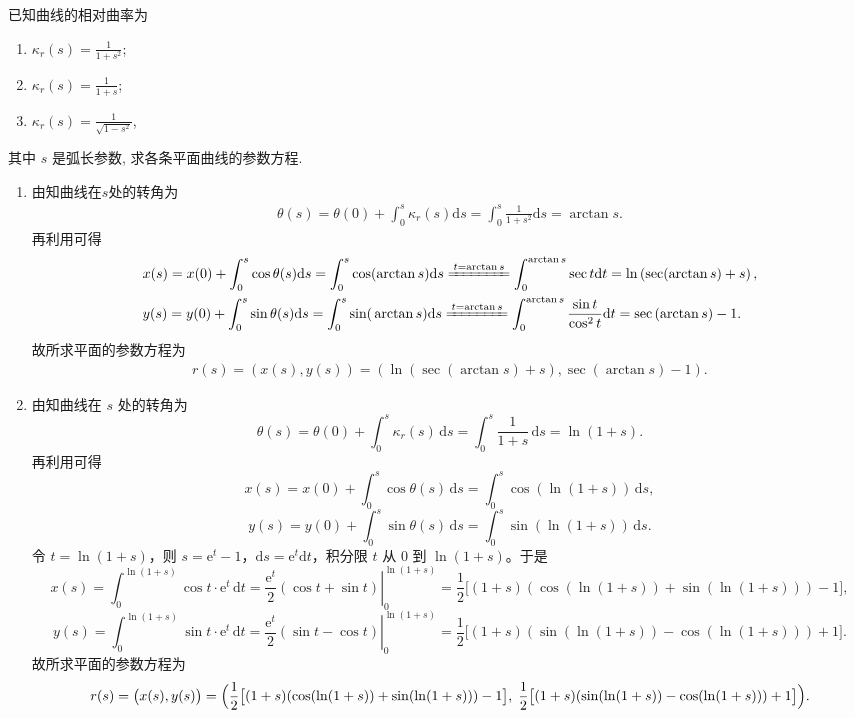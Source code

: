 \documentclass[../../main.tex]{subfiles}%
\begin{document}
\begin{example}
已知曲线的相对曲率为
\begin{enumerate}[(1)]
\item $\kappa_r(s)=\frac{1}{1+s^2}$;
\item $\kappa_r(s)=\frac{1}{1+s}$;
\item $\kappa_r(s)=\frac{1}{\sqrt{1-s^2}}$,
\end{enumerate}
其中 $s$ 是弧长参数, 求各条平面曲线的参数方程.
\end{example}
\begin{solution}
\begin{enumerate}[(1)]
\item 由知曲线在$s$处的转角为
\begin{align*}
\theta(s)=\theta(0)+\int_0^s\kappa_r(s)\mathrm{d}s=\int_0^s\frac{1}{1+s^2}\mathrm{d}s=\arctan s.
\end{align*}
再利用可得
\begin{align*}
&x(s)=x(0)+\int_0^s\cos\theta(s)\mathrm{d}s=\int_0^s\cos(\arctan s)\mathrm{d}s\xlongequal{t=\arctan s}\int_0^{\arctan s}\sec t\mathrm{d}t=\ln\left(\sec(\arctan s)+s\right),\\
&y(s)=y(0)+\int_0^s{\sin \theta (s)\mathrm{d}s}=\int_0^s{\mathrm{sin(}\arctan s)\mathrm{d}s}\xlongequal{t=\arctan s}\int_0^{\arctan s}{\frac{\sin t}{\cos ^2t}\mathrm{d}t}=\sec \left( \arctan s \right) -1.
\end{align*}
故所求平面的参数方程为
\begin{align*}
r(s)=\left(x(s),y(s)\right)=\left(\ln\left(\sec(\arctan s)+s\right),\sec \left( \arctan s \right) -1\right).
\end{align*}

\item 由知曲线在 \(s\) 处的转角为
\[
\theta(s)=\theta(0)+\int_0^s\kappa_r(s)\,\mathrm{d}s=\int_0^s\frac{1}{1+s}\,\mathrm{d}s=\ln(1+s).
\]
再利用可得
\[
x(s)=x(0)+\int_0^s\cos\theta(s)\,\mathrm{d}s=\int_0^s\cos(\ln(1+s))\,\mathrm{d}s,
\]
\[
y(s)=y(0)+\int_0^s\sin\theta(s)\,\mathrm{d}s=\int_0^s\sin(\ln(1+s))\,\mathrm{d}s.
\]
令 \(t=\ln(1+s)\)，则 \(s=\mathrm{e}^t-1\)，\(\mathrm{d}s=\mathrm{e}^t\mathrm{d}t\)，积分限 \(t\) 从 \(0\) 到 \(\ln(1+s)\)。于是
\[
x(s)=\int_0^{\ln(1+s)}\cos t\cdot\mathrm{e}^t\,\mathrm{d}t
=\left.\frac{\mathrm{e}^t}{2}(\cos t+\sin t)\right|_0^{\ln(1+s)}
=\frac{1}{2}\bigl[(1+s)(\cos(\ln(1+s))+\sin(\ln(1+s)))-1\bigr],
\]
\[
y(s)=\int_0^{\ln(1+s)}\sin t\cdot\mathrm{e}^t\,\mathrm{d}t
=\left.\frac{\mathrm{e}^t}{2}(\sin t-\cos t)\right|_0^{\ln(1+s)}
=\frac{1}{2}\bigl[(1+s)(\sin(\ln(1+s))-\cos(\ln(1+s)))+1\bigr].
\]
故所求平面的参数方程为
\[
r(s)=\bigl(x(s),y(s)\bigr)=\Bigl(\frac{1}{2}\bigl[(1+s)(\cos(\ln(1+s))+\sin(\ln(1+s)))-1\bigr],\;
\frac{1}{2}\bigl[(1+s)(\sin(\ln(1+s))-\cos(\ln(1+s)))+1\bigr]\Bigr).
\]


\end{enumerate}
\end{solution}
\end{document}
